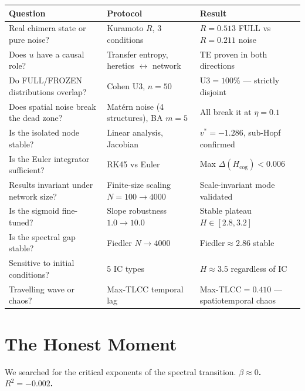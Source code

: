 \documentclass[11pt, a4paper]{article}
\newcommand{\result}[1]{\textbf{\color{positive}#1}}
\begin{document}
\renewcommand{\arraystretch}{1.2}
\begin{tabularx}{\linewidth}{>{\raggedright}p{5.5cm} >{\raggedright}p{4.5cm} >{\raggedright\arraybackslash}X}
\toprule
\textbf{Question} & \textbf{Protocol} & \textbf{Result} \\
\midrule
Real chimera state or pure noise? & Kuramoto $R$, 3 conditions & $R=0.513$ FULL vs $R=0.211$ noise \result{\checkmark} \\
Does $u$ have a causal role? & Transfer entropy, heretics $\leftrightarrow$ network & TE proven in both directions \result{\checkmark} \\
Do FULL/FROZEN distributions overlap? & Cohen U3, $n=50$ & U3$=100\%$ --- strictly disjoint \result{\checkmark} \\
Does spatial noise break the dead zone? & Matérn noise (4 structures), BA $m=5$ & All break it at $\eta=0.1$ \result{\checkmark} \\
Is the isolated node stable? & Linear analysis, Jacobian & $v^*=-1.286$, sub-Hopf confirmed \result{\checkmark} \\
Is the Euler integrator sufficient? & RK45 vs Euler & Max $\Delta(H_{\mathrm{cog}}) < 0.006$ \result{\checkmark} \\
Results invariant under network size? & Finite-size scaling $N=100\to4000$ & Scale-invariant mode validated \result{\checkmark} \\
Is the sigmoid fine-tuned? & Slope robustness $1.0\to10.0$ & Stable plateau $H\in[2.8, 3.2]$ \result{\checkmark} \\
Is the spectral gap stable? & Fiedler $N\to4000$ & Fiedler$\approx2.86$ stable \result{\checkmark} \\
Sensitive to initial conditions? & 5 IC types & $H\approx3.5$ regardless of IC \result{\checkmark} \\
Travelling wave or chaos? & Max-TLCC temporal lag & Max-TLCC$=0.410$ --- spatiotemporal chaos \result{\checkmark} \\
\bottomrule
\end{tabularx}

\section{The Honest Moment}

We searched for the critical exponents of the spectral transition. \textbf{$\beta \approx 0$. $R^2 = -0.002$.}
\end{document}
